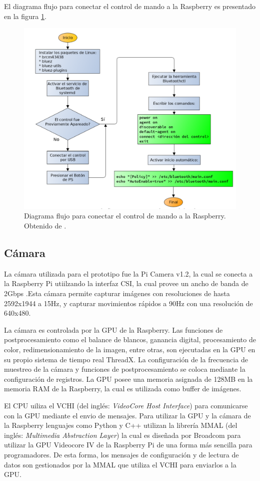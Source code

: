 El diagrama flujo para conectar el control de mando a la Raspberry es presentado en la figura \ref{imagen:DiagramaSaid}.

\begin{figure}[H]
	\centering	
	\includegraphics[width=0.7\linewidth]{imagenes/prototipo/DiagramaSaid}
	\caption[Diagrama de flujo del robot]{Diagrama flujo para conectar el control de mando a la Raspberry. Obtenido de \cite{said}.}
	\label{imagen:DiagramaSaid}
\end{figure}

\subsection{Cámara}

La cámara utilizada para el prototipo fue la Pi Camera v1.2, la cual se conecta a la Raspberry Pi utiilzando la interfaz CSI, la cual provee un ancho de banda de 2Gbps .Esta cámara permite capturar imágenes con resoluciones de hasta 2592x1944 a 15Hz, y capturar movimientos rápidos a 90Hz con una resolución de 640x480.

La cámara es controlada por la GPU de la Raspberry. Las funciones de postprocesamiento como el balance de blancos, ganancia digital, procesamiento de color, redimensionamiento de la imagen, entre otras, son ejecutadas en la GPU en su propio sistema de tiempo real ThreadX. La configuración de la frecuencia de muestreo de la cámara y funciones de postprocesamiento se coloca mediante la configuración de registros. La GPU posee una memoria asignada de 128MB en la memoria RAM de la Raspberry, la cual es utilizada como buffer de imágenes. 

El CPU uiliza el VCHI (del inglés: \textit{VideoCore Host Interface}) para comunicarse con la GPU mediante el envio de mensajes. Para utilizar la GPU y la cámara de la Raspberry lenguajes como Python y C++ utilizan la librería MMAL (del inglés: \textit{Multimedia Abstraction Layer}) la cual es diseñada por Broadcom para utilizar la GPU Videocore IV de la Raspberry Pi de una forma más sencilla para programadores. De esta forma, los mensajes de configuración y de lectura de datos son gestionados por la MMAL que utiliza el VCHI para enviarlos a la GPU.

